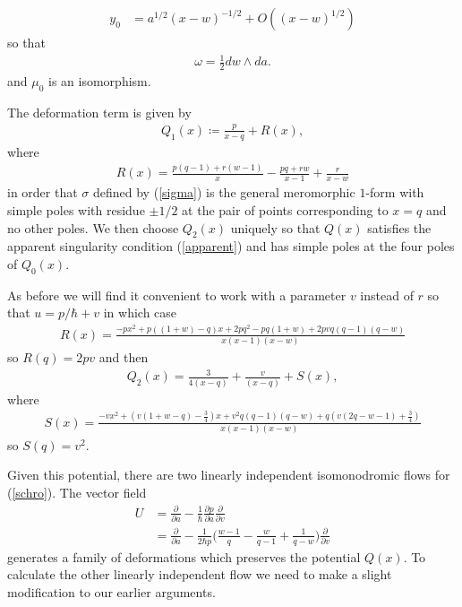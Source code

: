 \documentclass[a4paper,12pt,reqno]{amsart}
\numberwithin{equation}{section}
\numberwithin{counter2}{section}
\begin{document}
\begin{align}
 y_0 &= a^{1/2}(x-w)^{-1/2} +  O((x-w)^{1/2})
 \end{align}
 so that
 \begin{align}
 \omega = \frac{1}{2}dw \wedge da.  
 \end{align}
and $\mu_0$ is an isomorphism.  \par
The deformation term is given by 
\begin{align}\label{PVIQ1}
Q_1(x) \coloneqq \frac{p}{x-q} + R(x),  
\end{align}
where 
\begin{align}
R(x) = \frac{p(q-1)+r(w-1)}{x} - \frac{pq+rw}{x-1} + \frac{r}{x-w}
\end{align}
in order that $\sigma$ defined by (\ref{sigma}) is the general meromorphic $1$-form with simple poles with residue $\pm 1/2$ at the pair of points corresponding to $x = q$ and no other poles.  
We then choose $Q_2(x)$ uniquely so that $Q(x)$ satisfies the apparent singularity condition (\ref{apparent}) and has simple poles at the four poles of $Q_0(x)$.  \par 
As before we will find it convenient to work with a parameter $v$ instead of $r$ so that $u = p/\hbar + v$ in which case
\begin{align}
R(x) = \frac{-px^2+p((1+w)-q)x + 2pq^2 - pq(1+w)+ 2pvq(q-1)(q-w)}{x(x-1)(x-w)}
\end{align}
so $R(q) = 2pv$ and then 
\begin{align}\label{PVIQ2}
Q_2(x) = \frac{3}{4(x-q)} + \frac{v}{(x-q)} + S(x),
\end{align}
where
\begin{align}
S(x) = \frac{-vx^2 + (v(1+w-q)-\frac{3}{4})x + v^2q(q-1)(q-w) + q(v(2q -w - 1) + \frac{3}{4})}{x(x-1)(x-w)}
\end{align}
so $S(q) = v^2$.  \par
Given this potential,  there are two linearly independent isomonodromic flows for (\ref{schro}).  The vector field
\begin{align}
U &= \nonumber \frac{\partial}{\partial a} - \frac{1}{\hbar} \frac{\partial p}{\partial a}\frac{\partial}{\partial v}  \\
&= \frac{\partial}{\partial a}  - \frac{1}{2\hbar p}  \bigg(\frac{w-1}{q} - \frac{w}{q-1} + \frac{1}{q-w} \bigg) \frac{\partial}{\partial v}  
\end{align}
generates a family of deformations which preserves the potential $Q(x)$.  To calculate the other linearly independent flow we need to make a slight modification to our earlier arguments.  
\end{document}
